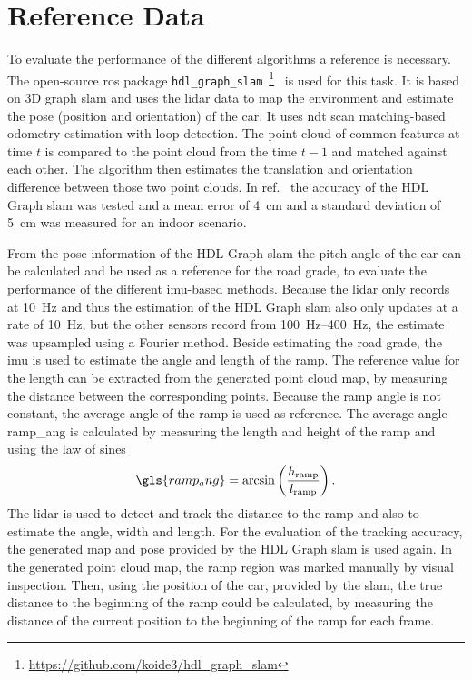 \section{Reference Data}
To evaluate the performance of the different algorithms a reference is necessary.
The open-source \gls{ros} package \texttt{hdl\_graph\_slam}~\footnote{\url{https://github.com/koide3/hdl_graph_slam}}~\cite{Koide2019} is used for this task.
It is based on 3D graph \gls{slam} and uses the \gls{lidar} data to map the environment and estimate the pose (position and orientation) of the car.
It uses \gls{ndt} scan matching-based odometry estimation with loop detection.
The point cloud of common features at time $t$ is compared to the point cloud from the time $t-1$ and matched against each other.
The algorithm then estimates the translation and orientation difference between those two point clouds.
In ref.~\cite{Akpnar2021} the accuracy of the HDL Graph \gls{slam} was tested and a mean error of \SI{4}{\cm} and a standard deviation of \SI{5}{\cm} was measured for an indoor scenario.\par
From the pose information of the HDL Graph \gls{slam} the pitch angle of the car can be calculated and be used as a reference for the road grade, to evaluate the performance of the different \gls{imu}-based methods.
Because the \gls{lidar} only records at \SI{10}{\hertz} and thus the estimation of the HDL Graph \gls{slam} also only updates at a rate of \SI{10}{\hertz}, but the other sensors record from \SIrange{100}{400}{\hertz}, the estimate was upsampled using a Fourier method.
Beside estimating the road grade, the \gls{imu} is used to estimate the angle and length of the ramp.
The reference value for the length can be extracted from the generated point cloud map, by measuring the distance between the corresponding points.
Because the ramp angle is not constant, the average angle of the ramp is used as reference.
The average angle \gls{ramp_ang} is calculated by measuring the length and height of the ramp and using the law of sines
\begin{equation}
    \gls{ramp_ang} = \arcsin\left(\frac{h_\mathrm{ramp}}{l_\mathrm{ramp}}\right).
\end{equation}
The \gls{lidar} is used to detect and track the distance to the ramp and also to estimate the angle, width and length.
For the evaluation of the tracking accuracy, the generated map and pose provided by the HDL Graph \gls{slam} is used again.
In the generated point cloud map, the ramp region was marked manually by visual inspection.
Then, using the position of the car, provided by the \gls{slam}, the true distance to the beginning of the ramp could be calculated, by measuring the distance of the current position to the beginning of the ramp for each frame.\par
